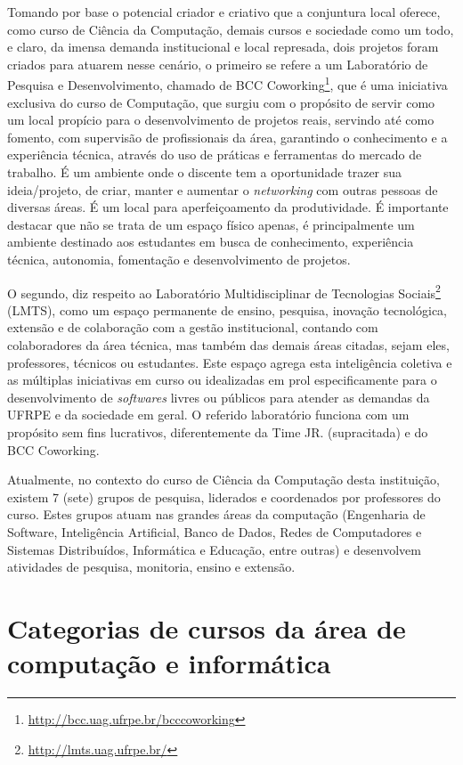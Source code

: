 \documentclass[
	12pt,				%
	openright,			%
  oneside,     %
	a4paper,			%
	chapter=TITLE,		%
	english,			%
	french,				%
	spanish,			%
	brazil				%
	]{abntex2}
\begin{document}
Tomando por base o potencial criador e criativo que a conjuntura local oferece, como curso de Ciência da Computação, demais cursos e sociedade como um todo, e claro, da imensa demanda institucional e local represada, dois projetos foram criados para atuarem nesse cenário, o primeiro se refere a um Laboratório de Pesquisa e Desenvolvimento, chamado de BCC Coworking\footnote{\url{http://bcc.uag.ufrpe.br/bcccoworking}}, que é uma iniciativa exclusiva do curso de Computação, que surgiu com o propósito de servir como um local propício para o desenvolvimento de projetos reais, servindo até como fomento, com supervisão de profissionais da área, garantindo o conhecimento e a experiência técnica, através do uso de práticas e ferramentas do mercado de trabalho. É um ambiente onde o discente tem a oportunidade trazer sua ideia/projeto, de criar, manter e aumentar o \textit{networking} com outras pessoas de diversas áreas. É um local para aperfeiçoamento da produtividade. É importante destacar que não se trata de um espaço físico apenas, é principalmente um ambiente destinado aos estudantes em busca de conhecimento, experiência técnica, autonomia, fomentação e desenvolvimento de projetos. 

O segundo, diz respeito ao Laboratório Multidisciplinar de Tecnologias Sociais\footnote{\url{http://lmts.uag.ufrpe.br/}} (LMTS), como um espaço permanente de ensino, pesquisa, inovação tecnológica, extensão e de colaboração com a gestão institucional, contando com colaboradores da área técnica, mas também das demais áreas citadas, sejam eles, professores, técnicos ou estudantes. Este espaço agrega esta inteligência coletiva e as múltiplas iniciativas em curso ou idealizadas em prol especificamente para o desenvolvimento de \textit{softwares} livres ou públicos para atender as demandas da UFRPE e da sociedade em geral. O referido laboratório funciona com um propósito sem fins lucrativos, diferentemente da Time JR. (supracitada) e do BCC Coworking.

Atualmente, no contexto do curso de Ciência da Computação desta instituição, existem 7 (sete) grupos de pesquisa, liderados e coordenados por professores do curso. Estes grupos atuam nas grandes áreas da computação (Engenharia de Software, Inteligência Artificial, Banco de Dados, Redes de Computadores e Sistemas Distribuídos, Informática e Educação, entre outras) e desenvolvem atividades de pesquisa, monitoria, ensino e extensão.

\section{Categorias de cursos da área de computação e informática}
\end{document}
